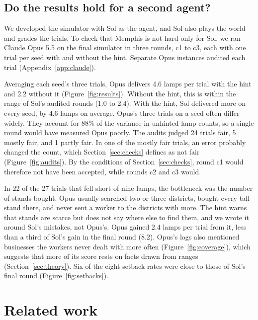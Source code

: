 \documentclass[10pt]{article}
\begin{document}
\subsection{Do the results hold for a second agent?}
\label{sec:claude}

We developed the simulator with Sol as the agent, and Sol also plays the world and grades the trials. To check that Memphis is not hard only for Sol, we ran Claude Opus 5.5 on the final simulator in three rounds, c1 to c3, each with one trial per seed with and without the hint. Separate Opus instances audited each trial (Appendix~\ref{app:claude}).

Averaging each seed's three trials, Opus delivers 4.6 lamps per trial with the hint and 2.2 without it (Figure~\ref{fig:results}). Without the hint, this is within the range of Sol's audited rounds (1.0 to 2.4). With the hint, Sol delivered more on every seed, by 4.6 lamps on average. Opus's three trials on a seed often differ widely. They account for 88\% of the variance in unhinted lamp counts, so a single round would have measured Opus poorly. The audits judged 24 trials fair, 5 mostly fair, and 1 partly fair. In one of the mostly fair trials, an error probably changed the count, which Section~\ref{sec:checks} defines as not fair (Figure~\ref{fig:audits}). By the conditions of Section~\ref{sec:checks}, round c1 would therefore not have been accepted, while rounds c2 and c3 would.

In 22 of the 27 trials that fell short of nine lamps, the bottleneck was the number of stands bought. Opus usually searched two or three districts, bought every tall stand there, and never sent a worker to the districts with more. The hint warns that stands are scarce but does not say where else to find them, and we wrote it around Sol's mistakes, not Opus's. Opus gained 2.4 lamps per trial from it, less than a third of Sol's gain in the final round (8.2). Opus's logs also mentioned businesses the workers never dealt with more often (Figure~\ref{fig:coverage}), which suggests that more of its score rests on facts drawn from ranges (Section~\ref{sec:theory}). Six of the eight setback rates were close to those of Sol's final round (Figure~\ref{fig:setbacks}).

\section{Related work}
\end{document}
